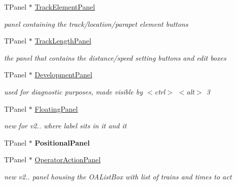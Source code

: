\begin{DoxyCompactItemize}
T\+Panel $\ast$ \mbox{\hyperlink{class_t_interface_a94de13b77e51b4894755d1564d812cda}{Track\+Element\+Panel}}
\begin{DoxyCompactList}\small\item\em panel containing the track/location/parapet element buttons \end{DoxyCompactList}\item 
\mbox{\label{class_t_interface_abc8305e8654aeac73f905b3fa8f9eb7b}} 
T\+Panel $\ast$ \mbox{\hyperlink{class_t_interface_abc8305e8654aeac73f905b3fa8f9eb7b}{Track\+Length\+Panel}}
\begin{DoxyCompactList}\small\item\em the panel that contains the distance/speed setting buttons and edit boxes \end{DoxyCompactList}\item 
\mbox{\label{class_t_interface_a82ceb0b38e171d2b46c19f76afef35c1}} 
T\+Panel $\ast$ \mbox{\hyperlink{class_t_interface_a82ceb0b38e171d2b46c19f76afef35c1}{Development\+Panel}}
\begin{DoxyCompactList}\small\item\em used for diagnostic purposes, made visible by $<$ctrl$>$ $<$alt$>$ \textquotesingle{}3\textquotesingle{} \end{DoxyCompactList}\item 
\mbox{\label{class_t_interface_a424f4da4b4f2795f36ac40c8dc2a9a10}} 
T\+Panel $\ast$ \mbox{\hyperlink{class_t_interface_a424f4da4b4f2795f36ac40c8dc2a9a10}{Floating\+Panel}}
\begin{DoxyCompactList}\small\item\em new for v2.. where label sits in it and it \end{DoxyCompactList}\item 
\mbox{\label{class_t_interface_a0e02497aefb9ea945fd1cab9999e792e}} 
T\+Panel $\ast$ {\bfseries Positional\+Panel}
\item 
\mbox{\label{class_t_interface_aa17115ed5820e0ff28801224b6bc4e4a}} 
T\+Panel $\ast$ \mbox{\hyperlink{class_t_interface_aa17115ed5820e0ff28801224b6bc4e4a}{Operator\+Action\+Panel}}
\begin{DoxyCompactList}\small\item\em new v2.. panel housing the O\+A\+List\+Box with list of trains and times to act \end{DoxyCompactList}\item 

\end{DoxyCompactItemize}
